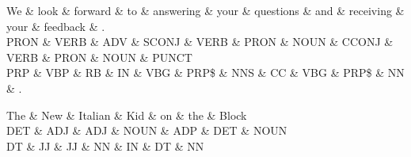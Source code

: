 \begin{dependency}
\begin{deptext}
We \& look \& forward \& to \& answering \& your \& questions \& and \& receiving \& your \& feedback \& . \\
PRON \& VERB \& ADV \& SCONJ \& VERB \& PRON \& NOUN \& CCONJ \& VERB \& PRON \& NOUN \& PUNCT \\
PRP \& VBP \& RB \& IN \& VBG \& PRP\$ \& NNS \& CC \& VBG \& PRP\$ \& NN \& . \\
\end{deptext}



\end{dependency}

\begin{dependency}
\begin{deptext}
The \& New \& Italian \& Kid \& on \& the \& Block \\
DET \& ADJ \& ADJ \& NOUN \& ADP \& DET \& NOUN \\
DT \& JJ \& JJ \& NN \& IN \& DT \& NN \\
\end{deptext}



\end{dependency}

